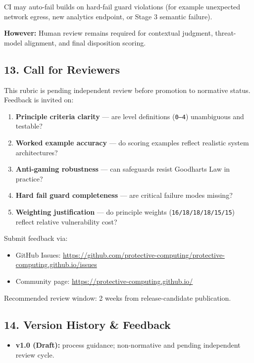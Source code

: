 \documentclass[
]{article}
\providecommand{\tightlist}{%
  \setlength{\itemsep}{0pt}\setlength{\parskip}{0pt}}
\begin{document}
CI may auto-fail builds on hard-fail guard violations (for example
unexpected network egress, new analytics endpoint, or Stage 3 semantic
failure).

\textbf{However:} Human review remains required for contextual judgment,
threat-model alignment, and final disposition scoring.

\subsection{13. Call for Reviewers}\label{13-call-for-reviewers}

This rubric is pending independent review before promotion to normative
status. Feedback is invited on:

\begin{enumerate}
\def\labelenumi{\arabic{enumi}.}
\tightlist
\item
  \textbf{Principle criteria clarity} --- are level definitions
  (\texttt{0–4}) unambiguous and testable?
\item
  \textbf{Worked example accuracy} --- do scoring examples reflect
  realistic system architectures?
\item
  \textbf{Anti-gaming robustness} --- can safeguards resist
  Goodhart\textquotesingle s Law in practice?
\item
  \textbf{Hard fail guard completeness} --- are critical failure modes
  missing?
\item
  \textbf{Weighting justification} --- do principle weights
  (\texttt{16/18/18/18/15/15}) reflect relative vulnerability cost?
\end{enumerate}

Submit feedback via:

\begin{itemize}
\tightlist
\item
  GitHub Issues:
  \url{https://github.com/protective-computing/protective-computing.github.io/issues}
\item
  Community page: \url{https://protective-computing.github.io/}
\end{itemize}

Recommended review window: 2 weeks from release-candidate publication.

\subsection{14. Version History \&
Feedback}\label{14-version-history--feedback}

\begin{itemize}
\tightlist
\item
  \textbf{v1.0 (Draft):} process guidance; non-normative and pending
  independent review cycle.
\end{itemize}
\end{document}
